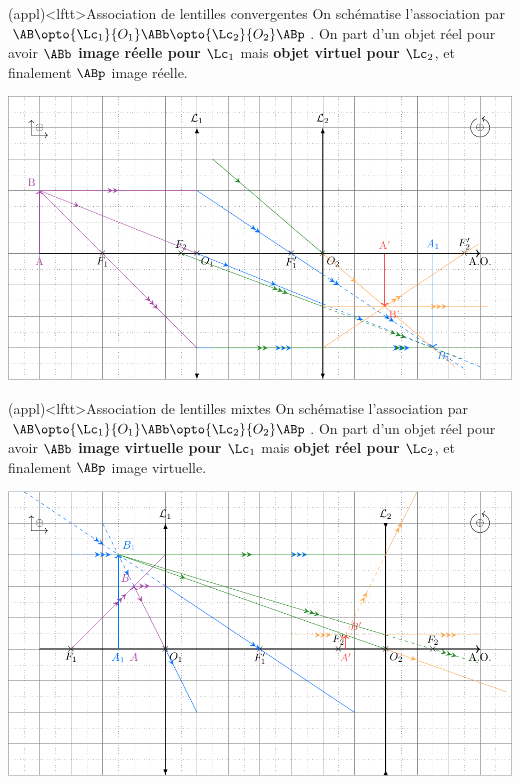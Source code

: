 \documentclass[../../main/main.tex]{subfiles}
\begin{document}
\begin{tcn}[label=exem:asso_lent](appl)<lftt>{Association de lentilles convergentes}
	On schématise l'association par $\AB \opto{\Lc_1}{O_1} \ABb
		\opto{\Lc_2}{O_2} \ABp$. On part d'un objet réel pour avoir $\ABb$
	\textbf{image réelle pour $\Lc_1$} mais \textbf{objet virtuel pour $\Lc_2$},
	et finalement $\ABp$ image réelle.
	\tcblower
	\begin{center}
		\includegraphics[width=.85\linewidth]{asso_lent-a.pdf}
		\label{fig:asso_lent-conv}
	\end{center}
\end{tcn}
\begin{tcn}[label=exem:asso_lent](appl)<lftt>{Association de lentilles mixtes}
	On schématise l'association par $\AB \opto{\Lc_1}{O_1} \ABb
		\opto{\Lc_2}{O_2} \ABp$. On part d'un objet réel pour avoir $\ABb$
	\textbf{image virtuelle pour $\Lc_1$} mais \textbf{objet réel pour $\Lc_2$},
	et finalement $\ABp$ image virtuelle.
	\tcblower
	\begin{center}
		\includegraphics[width=.85\linewidth]{asso_lent-b.pdf}
		\label{fig:asso_lent-mix}
	\end{center}
\end{tcn}
\end{document}
